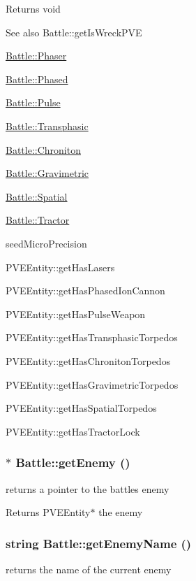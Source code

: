\begin{DoxyReturn}{Returns}
void
\end{DoxyReturn}
\begin{DoxySeeAlso}{See also}
Battle::getIsWreckPVE

\hyperlink{classBattle_ac47c4c6769ba4c285b6b3bce196665f7}{Battle::Phaser} 

\hyperlink{classBattle_af93833dc6f45a9a9b57b3fd0a98c7b53}{Battle::Phased} 

\hyperlink{classBattle_abb853e7323e8c06115d261476eb60da6}{Battle::Pulse} 

\hyperlink{classBattle_a291ea216c6a4a576c9cd287ddf5afb89}{Battle::Transphasic} 

\hyperlink{classBattle_ac27cb8ae9cc2220d90446de6d5c2a03e}{Battle::Chroniton} 

\hyperlink{classBattle_a59fbad01d3da6683a902601dee2a244c}{Battle::Gravimetric} 

\hyperlink{classBattle_af3866096de0e01ea273b211d0babaade}{Battle::Spatial} 

\hyperlink{classBattle_a36916b73287143368e13759da9a64842}{Battle::Tractor}

seedMicroPrecision

PVEEntity::getHasLasers 

PVEEntity::getHasPhasedIonCannon 

PVEEntity::getHasPulseWeapon 

PVEEntity::getHasTransphasicTorpedos 

PVEEntity::getHasChronitonTorpedos 

PVEEntity::getHasGravimetricTorpedos 

PVEEntity::getHasSpatialTorpedos 

PVEEntity::getHasTractorLock 
\end{DoxySeeAlso}
\hypertarget{classBattle_aafeb9f025d6d77ba8a58a3fbd386c039}{
\subsubsection[{getEnemy}]{ $\ast$ Battle::getEnemy ()}}
\label{dd/dfd/classBattle_aafeb9f025d6d77ba8a58a3fbd386c039}
returns a pointer to the battles enemy

\begin{DoxyReturn}{Returns}
PVEEntity$\ast$ the enemy 
\end{DoxyReturn}
\hypertarget{classBattle_a5d850d794776aac6b7d742f3385ce82a}{
\subsubsection[{getEnemyName}]{\setlength{\rightskip}{0pt plus 5cm}string Battle::getEnemyName ()}}
\label{dd/dfd/classBattle_a5d850d794776aac6b7d742f3385ce82a}
returns the name of the current enemy

